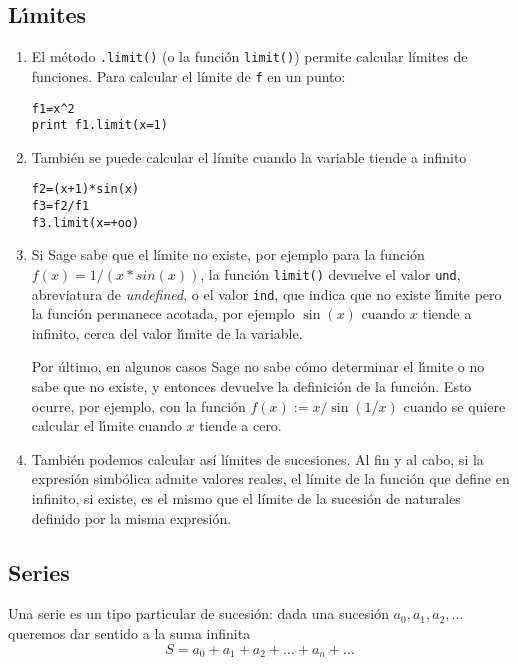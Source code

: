 \subsection{L\'{\i}mites}
\begin{enumerate}
 \item El método  \lstinline|.limit()| (o la función \lstinline|limit()|) 
permite calcular
límites de funciones. Para calcular el límite de \verb|f| en un punto:
\begin{lstlisting}[numbers=none]
f1=x^2
print f1.limit(x=1)
\end{lstlisting}
 \item Tambi\'en se puede calcular el límite cuando la variable tiende a
infinito

\begin{lstlisting}[numbers=none]
f2=(x+1)*sin(x)
f3=f2/f1
f3.limit(x=+oo)
\end{lstlisting}
\item Si Sage sabe que el límite no existe, por ejemplo para la funci\'on
$f(x)=1/(x*sin(x))$, la función \lstinline|limit()| devuelve el
valor \lstinline|und|, abreviatura de \emph{undefined},  o el valor
\lstinline|ind|, que indica que no existe l\'{\i}mite pero
la funci\'on permanece acotada, por ejemplo $\sin(x)$ cuando $x$ tiende a
infinito,   cerca del valor l\'{\i}mite de la variable.

Por \'ultimo, en algunos casos Sage no sabe c\'omo determinar el l\'{\i}mite o
no sabe que no existe, y entonces devuelve la definici\'on de la funci\'on. Esto
ocurre, por ejemplo, con la funci\'on $f(x):=x/\sin(1/x)$ cuando se quiere
calcular el l\'{\i}mite cuando $x$ tiende a cero.

 \item También podemos calcular así límites de sucesiones. Al fin y al cabo, si
la
expresión simbólica admite valores reales, el límite de la función que define en
infinito, si existe, es el mismo que el límite de la sucesión de naturales
definido por la misma expresión.
\end{enumerate}




\subsection{Series}

Una serie es un tipo particular de sucesi\'on: dada una sucesi\'on
$a_0,a_1,a_2,\dots$  queremos dar sentido a la suma infinita 
\[S=a_0+a_1+a_2+\dots+a_n+\dots\]

